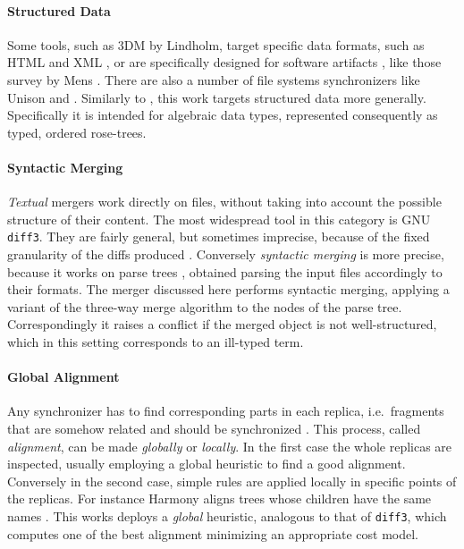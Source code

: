 \documentclass[../Thesis.tex]{subfiles}
\begin{document}
	\paragraph{Structured Data}
	 Some tools, such as 3DM by Lindholm, target specific data formats, such as 
	 HTML and XML \cite{Lind04, Lind05}, or are specifically designed for 
	 software  artifacts \cite{Apel11, Westfechtel91}, like those
	 survey by Mens \cite{Mens02}.
	 There are also a number of file systems synchronizers like Unison
	 \cite{Pierce98, UnisonSpec} and	 \cite{Ramsey01}.	 
	 Similarly to \cite{Chawathe96, Chawathe97}, this work targets structured 
	 data more generally.
	 Specifically it is intended for algebraic data types, represented 
	 consequently as typed, ordered rose-trees.
	 
	\paragraph{Syntactic Merging}	
	\emph{Textual} mergers work directly on files, without taking into account 
	the possible structure of their content. The most widespread tool in this 
	category is GNU \texttt{diff3}. 
	They are fairly general, but sometimes imprecise, because of the fixed
	granularity of the diffs produced \cite{Mens02}.
	Conversely \emph{syntactic merging} is more precise, because it 
	works on parse trees \cite{Mens02}, obtained parsing the input files
	accordingly to their formats.
	The merger discussed here performs syntactic merging, applying
	a variant of the three-way merge algorithm to the nodes of the parse tree.
	Correspondingly it raises a conflict if the merged
	object is not well-structured, which in this setting corresponds to 
	an ill-typed term.
	
	\paragraph{Global Alignment}
	Any synchronizer has to find corresponding parts in each replica, i.e.\
	fragments that are somehow related and should be synchronized 
	\cite{Pierce07}.
	This process, called \emph{alignment}, can be made \emph{globally} or 
	\emph{locally}. In the first case the whole replicas are inspected, usually
	employing a global heuristic to find a good alignment. 
	Conversely in the second case, simple rules are applied locally in specific 
	points of the replicas. For instance Harmony aligns trees whose
	children have the same names \cite{Pierce07}.
	This works deploys a \emph{global} heuristic, analogous to that
	of \texttt{diff3}, which computes one of the best alignment minimizing an
	appropriate cost model.	
	
\end{document}

